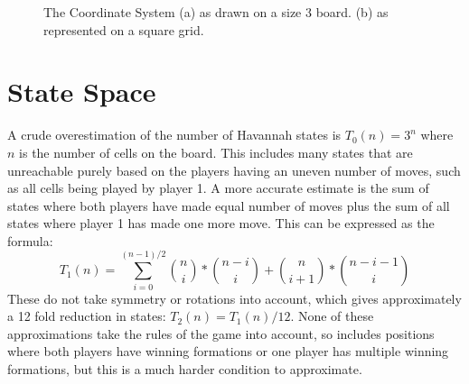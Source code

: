 \begin{figure}
\centering
\caption[The Coordinate System]{The Coordinate System (a) as drawn on a size 3 board. (b) as represented on a square grid.}
\label{fig:coordinates}
\end{figure}


\section{State Space}

A crude overestimation of the number of Havannah states is $T_0(n) = 3^n$ where $n$ is the number of cells on the board. This includes many states that are unreachable purely based on the players having an uneven number of moves, such as all cells being played by player 1. A more accurate estimate is the sum of states where both players have made equal number of moves plus the sum of all states where player 1 has made one more move. This can be expressed as the formula:
$$T_1(n) = \sum_{i = 0}^{(n-1)/2} {n \choose i}*{n-i \choose i} + {n \choose i + 1}*{n - i - 1 \choose i}$$
These do not take symmetry or rotations into account, which gives approximately a 12 fold reduction in states: $T_2(n) = T_1(n)/12$. None of these approximations take the rules of the game into account, so includes positions where both players have winning formations or one player has multiple winning formations, but this is a much harder condition to approximate.

